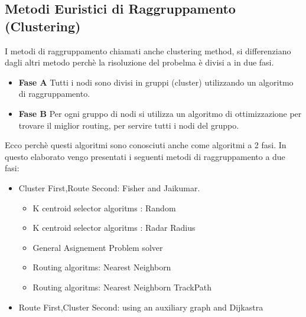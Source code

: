 \documentclass[]{article}
\begin{document}
\subsection{Metodi Euristici di Raggruppamento (Clustering)}
I metodi di raggruppamento chiamati anche clustering method, si differenziano dagli altri metodo perchè la risoluzione del probelma è divisi a in due fasi.
\begin{itemize}
\item \textbf{Fase A} Tutti i nodi sono divisi in gruppi (cluster) utilizzando un algoritmo di raggruppamento.
\item \textbf{Fase B} Per ogni gruppo di nodi si utilizza un algoritmo di ottimizzazione per trovare il miglior routing, per servire tutti i nodi del gruppo.
\end{itemize}
Ecco perchè questi algoritmi sono conosciuti anche come algoritmi a 2 fasi.
In questo elaborato vengo presentati i seguenti metodi di raggruppamento a due fasi:
\begin{itemize}
	\item Cluster First,Route Second: Fisher and Jaikumar.
		\begin{itemize}
			\item K centroid selector algoritms :  Random
			\item K centroid selector algoritms :  Radar Radius
			\item General Asignement Problem solver
			\item Routing algoritms: Nearest Neighborn
			\item Routing algoritms: Nearest Neighborn TrackPath		
		\end{itemize}
	\item Route First,Cluster Second: using an auxiliary graph and Dijkastra
\end{itemize}
\end{document}
